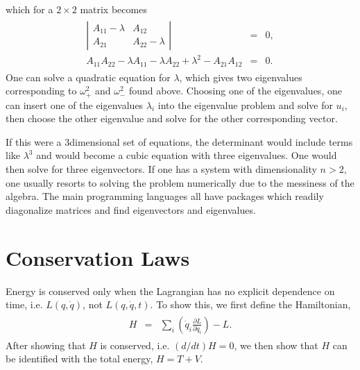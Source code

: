 \documentclass[letterpaper,10pt,english]{sphinxmanual}
\begin{document}
which for a \(2\times 2\) matrix becomes
\begin{equation*}
\begin{split}
\begin{eqnarray}
\left|
\begin{array}{cc}
A_{11}-\lambda&A_{12}\\
A_{21}&A_{22}-\lambda
\end{array}
\right|&=&0,\\
A_{11}A_{22}-\lambda A_{11}-\lambda A_{22}+\lambda^2-A_{21}A_{12}&=&0.
\end{eqnarray}
\end{split}
\end{equation*}
One can solve a quadratic equation for \(\lambda\), which gives two
eigenvalues corresponding to \(\omega_+^2\) and \(\omega_-^2\) found
above. Choosing one of the eigenvalues, one can insert one of the
eigenvalues \(\lambda_i\) into the eigenvalue problem  and solve for \(u_i\),
then choose the other eigenvalue and solve for the other corresponding
vector.

If this were a 3\sphinxhyphen{}dimensional set of equations, the determinant would
include terms like \(\lambda^3\) and would become a cubic equation with
three eigenvalues. One would then solve for three eigenvectors. If one
has a system with dimensionality \(n>2\), one usually resorts to solving
the problem numerically due to the messiness of the algebra. The main
programming languages all have packages which readily diagonalize
matrices and find eigenvectors and eigenvalues.


\section{Conservation Laws}
\label{\detokenize{chapter1:conservation-laws}}
Energy is conserved only when the Lagrangian has no explicit
dependence on time, i.e. \(L(q,\dot{q})\), not \(L(q,\dot{q},t)\). To show
this, we first define the Hamiltonian,
\begin{equation*}
\begin{split}
\begin{eqnarray}
H&=&\sum_i\left(\dot{q}_i\frac{\partial L}{\partial\dot{q}_i}\right)-L.
\end{eqnarray}
\end{split}
\end{equation*}
After showing that \(H\) is conserved, i.e. \((d/dt)H=0\), we then show
that \(H\) can be identified with the total energy, \(H=T+V\).
\end{document}
